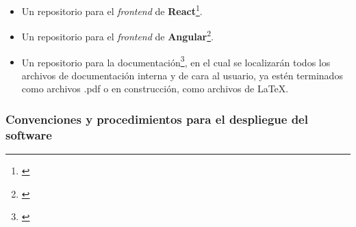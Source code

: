 \documentclass[11pt, a4paper, titlepage]{article}
\begin{document}
\begin{itemize}
\begin{itemize}
        \item Un repositorio para el \textit{frontend} de \textbf{React}\footnote{\href{https://github.com/UNIZAR-30226-2022-01/proyecto_software_frontend_react}{}}.

        \item Un repositorio para el \textit{frontend} de \textbf{Angular}\footnote{\href{https://github.com/UNIZAR-30226-2022-01/proyecto_software_frontend_angular}{}}.

        \item Un repositorio para la documentación\footnote{\href{https://github.com/UNIZAR-30226-2022-01/proyecto_software_documentacion}{\color{blue}{Repositorio de documentación}}}, en el cual se localizarán todos los archivos de documentación interna y de cara al usuario, ya estén terminados como archivos .pdf o en construcción, como archivos de \LaTeX.
    \end{itemize}




\end{itemize}

\subsubsection{Convenciones y procedimientos para el despliegue del software}
\end{document}

